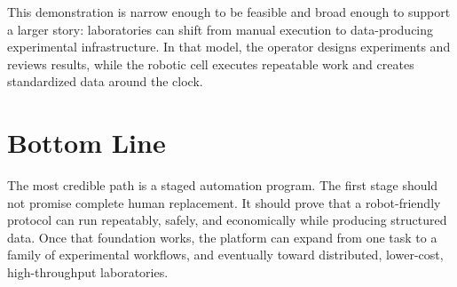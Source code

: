 \documentclass[11pt]{article}
\begin{document}
This demonstration is narrow enough to be feasible and broad enough to support a larger story: laboratories can shift from manual execution to data-producing experimental infrastructure. In that model, the operator designs experiments and reviews results, while the robotic cell executes repeatable work and creates standardized data around the clock.

\section{Bottom Line}

The most credible path is a staged automation program. The first stage should not promise complete human replacement. It should prove that a robot-friendly protocol can run repeatably, safely, and economically while producing structured data. Once that foundation works, the platform can expand from one task to a family of experimental workflows, and eventually toward distributed, lower-cost, high-throughput laboratories.
\end{document}

